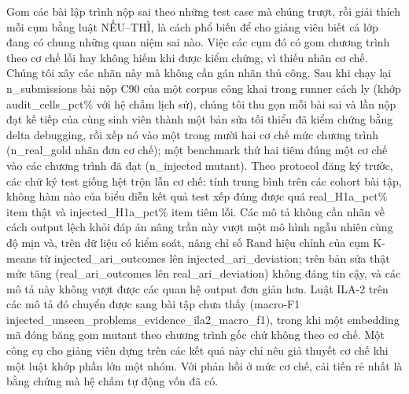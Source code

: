 Gom các bài lập trình nộp sai theo những test case mà chúng trượt, rồi giải thích mỗi cụm bằng luật NẾU--THÌ, là cách phổ biến để cho giảng viên biết cả lớp đang có chung những quan niệm sai nào. Việc các cụm đó có gom chương trình theo cơ chế lỗi hay không hiếm khi được kiểm chứng, vì thiếu nhãn cơ chế. Chúng tôi xây các nhãn này mà không cần gán nhãn thủ công. Sau khi chạy lại {{n_submissions}} bài nộp C90 của một corpus công khai trong runner cách ly (khớp {{audit_cells_pct}}\% với hệ chấm lịch sử), chúng tôi thu gọn mỗi bài sai và lần nộp đạt kế tiếp của cùng sinh viên thành một bản sửa tối thiểu đã kiểm chứng bằng delta debugging, rồi xếp nó vào một trong mười hai cơ chế mức chương trình ({{n_real_gold}} nhãn đơn cơ chế); một benchmark thứ hai tiêm đúng một cơ chế vào các chương trình đã đạt ({{n_injected}} mutant). Theo protocol đăng ký trước, các chữ ký test giống hệt trộn lẫn cơ chế: tính trung bình trên các cohort bài tập, không hàm nào của biểu diễn kết quả test xếp đúng được quá {{real_H1a_pct}}\% item thật và {{injected_H1a_pct}}\% item tiêm lỗi. Các mô tả không cần nhãn về cách output lệch khỏi đáp án nâng trần này vượt một mô hình ngẫu nhiên cùng độ mịn và, trên dữ liệu có kiểm soát, nâng chỉ số Rand hiệu chỉnh của cụm K-means từ {{injected_ari_outcomes}} lên {{injected_ari_deviation}}; trên bản sửa thật mức tăng ({{real_ari_outcomes}} lên {{real_ari_deviation}}) không đáng tin cậy, và các mô tả này không vượt được các quan hệ output đơn giản hơn. Luật ILA-2 trên các mô tả đó chuyển được sang bài tập chưa thấy (macro-F1 {{injected_unseen_problems_evidence_ila2_macro_f1}}), trong khi một embedding mã đóng băng gom mutant theo chương trình gốc chứ không theo cơ chế. Một công cụ cho giảng viên dựng trên các kết quả này chỉ nêu giả thuyết cơ chế khi một luật khớp phần lớn một nhóm. Với phản hồi ở mức cơ chế, cải tiến rẻ nhất là bằng chứng mà hệ chấm tự động vốn đã có.
